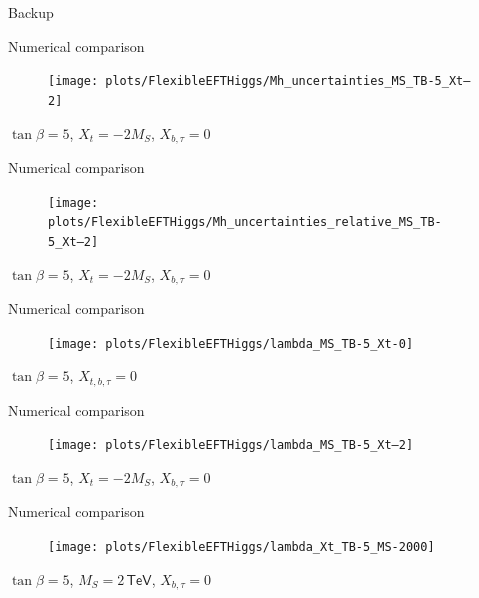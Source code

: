\documentclass[hyperref={pdfpagelabels=false},ngerman]{beamer}
\newcommand{\eh}[1]{\,\mathsf{#1}}
\begin{document}
\begin{frame}[noframenumbering]
  \begin{center}
    \Huge Backup
  \end{center}
\end{frame}


\begin{frame}[noframenumbering]{Numerical comparison}
  \begin{figure}
    \centering
    \texttt{[image: plots/FlexibleEFTHiggs/Mh\_uncertainties\_MS\_TB-5\_Xt--2]}
  \end{figure}
  $\tan\beta = 5$, $X_t = -2 M_S$, $X_{b,\tau} = 0$
\end{frame}

\begin{frame}[noframenumbering]{Numerical comparison}
  \begin{figure}
    \centering
    \texttt{[image: plots/FlexibleEFTHiggs/Mh\_uncertainties\_relative\_MS\_TB-5\_Xt--2]}
  \end{figure}
  $\tan\beta = 5$, $X_t = -2 M_S$, $X_{b,\tau} = 0$
\end{frame}

\begin{frame}[noframenumbering]{Numerical comparison}
  \begin{figure}
    \centering
    \texttt{[image: plots/FlexibleEFTHiggs/lambda\_MS\_TB-5\_Xt-0]}
  \end{figure}
  $\tan\beta = 5$, $X_{t,b,\tau} = 0$
\end{frame}

\begin{frame}[noframenumbering]{Numerical comparison}
  \begin{figure}
    \centering
    \texttt{[image: plots/FlexibleEFTHiggs/lambda\_MS\_TB-5\_Xt--2]}
  \end{figure}
  $\tan\beta = 5$, $X_t = -2 M_S$, $X_{b,\tau} = 0$
\end{frame}

\begin{frame}[noframenumbering]{Numerical comparison}
  \begin{figure}
    \centering
    \texttt{[image: plots/FlexibleEFTHiggs/lambda\_Xt\_TB-5\_MS-2000]}
  \end{figure}
  $\tan\beta = 5$, $M_S = 2\eh{TeV}$, $X_{b,\tau} = 0$
\end{frame}

\end{document}
